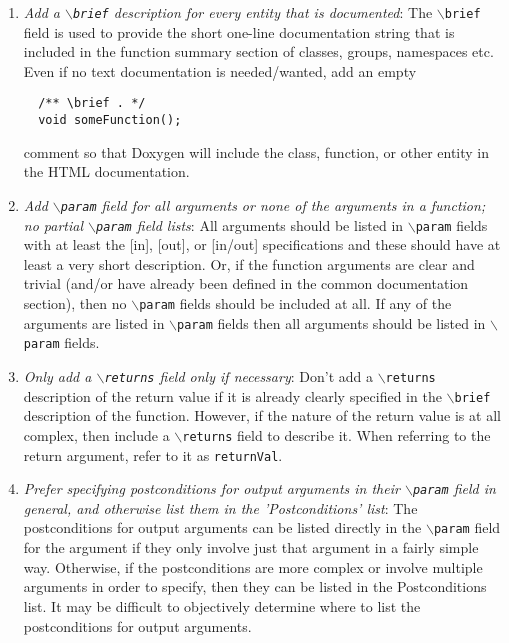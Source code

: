\begin{enumerate}
{}\item\textit{Add a {}\texttt{$\backslash$brief} description for every entity
that is documented}: The {}\texttt{$\backslash$brief} field is used to provide
the short one-line documentation string that is included in the function
summary section of classes, groups, namespaces etc.  Even if no text
documentation is needed/wanted, add an empty
%
{\small\begin{verbatim}
  /** \brief . */
  void someFunction();
\end{verbatim}}
%
comment so that Doxygen will include the class, function, or other entity in
the HTML documentation.

{}\item\textit{Add {}\texttt{$\backslash$param} field for all arguments or
none of the arguments in a function; no partial {}\texttt{$\backslash$param}
field lists}: All arguments should be listed in {}\texttt{$\backslash$param}
fields with at least the [in], [out], or [in/out] specifications and these
should have at least a very short description.  Or, if the function arguments
are clear and trivial (and/or have already been defined in the common
documentation section), then no {}\texttt{$\backslash$param} fields should be
included at all.  If any of the arguments are listed in
{}\texttt{$\backslash$param} fields then all arguments should be listed in
{}\texttt{$\backslash$param} fields.

{}\item\textit{Only add a {}\texttt{$\backslash$returns} field only if
necessary}: Don't add a {}\texttt{$\backslash$returns} description of the
return value if it is already clearly specified in the
{}\texttt{$\backslash$brief} description of the function.  However, if the
nature of the return value is at all complex, then include a
{}\texttt{$\backslash$returns} field to describe it.  When referring to the
return argument, refer to it as {}\texttt{returnVal}.

{}\item\textit{Prefer specifying postconditions for output arguments in their
{}\texttt{$\backslash$param} field in general, and otherwise list them in the
'Postconditions' list}: The postconditions for output arguments can be listed
directly in the {}\texttt{$\backslash$param} field for the argument if they
only involve just that argument in a fairly simple way.  Otherwise, if the
postconditions are more complex or involve multiple arguments in order to
specify, then they can be listed in the Postconditions list.  It may be
difficult to objectively determine where to list the postconditions for output
arguments.


\end{enumerate}
